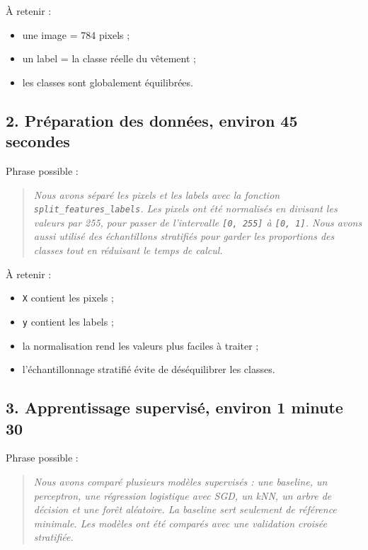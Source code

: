 \documentclass[11pt,a4paper]{article}
\begin{document}
À retenir :

\begin{itemize}
\item une image = 784 pixels ;
\item un label = la classe réelle du vêtement ;
\item les classes sont globalement équilibrées.
\end{itemize}

\subsection{2. Préparation des données, environ 45 secondes}

Phrase possible :

\begin{quote}
\itshape Nous avons séparé les pixels et les labels avec la fonction \texttt{split\_features\_labels}. Les pixels ont été normalisés en divisant les valeurs par 255, pour passer de l'intervalle \texttt{[0, 255]} à \texttt{[0, 1]}. Nous avons aussi utilisé des échantillons stratifiés pour garder les proportions des classes tout en réduisant le temps de calcul.
\end{quote}

À retenir :

\begin{itemize}
\item \texttt{X} contient les pixels ;
\item \texttt{y} contient les labels ;
\item la normalisation rend les valeurs plus faciles à traiter ;
\item l'échantillonnage stratifié évite de déséquilibrer les classes.
\end{itemize}

\subsection{3. Apprentissage supervisé, environ 1 minute 30}

Phrase possible :

\begin{quote}
\itshape Nous avons comparé plusieurs modèles supervisés : une baseline, un perceptron, une régression logistique avec SGD, un kNN, un arbre de décision et une forêt aléatoire. La baseline sert seulement de référence minimale. Les modèles ont été comparés avec une validation croisée stratifiée.
\end{quote}
\end{document}
